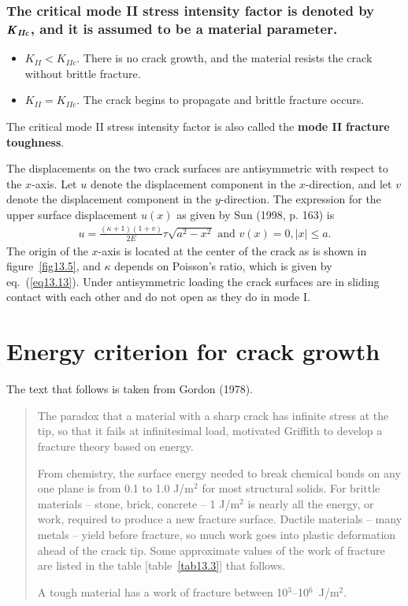 \documentclass{AeroStructure-ERJohnson}
\begin{document}
\subsubsection{The critical mode II stress intensity factor is denoted by $\textbf{\textit{K}}_{\textbf{\textit{IIc}}}$, and it is assumed to be a material parameter.}
\begin{itemize}
\item $K_{I I}<K_{I I c}$. There is no crack growth, and the material resists the crack without brittle fracture.
\item $K_{I I}=K_{I I c}$. The crack begins to propagate and brittle fracture occurs.
\end{itemize}
The critical mode II stress intensity factor is also called the \textbf{mode II} \textbf{fracture toughness}.

The displacements on the two crack surfaces are antisymmetric with respect to the $x$-axis. Let $u$ denote the displacement component in the $x$-direction, and let $v$ denote the displacement component in the $y$-direction. The expression for the upper surface displacement $u(x)$ as given by Sun (1998, p. 163) is
\begin{align}\label{eq13.21}
u=\frac{(\kappa+1)(1+v)}{2 E} \tau \sqrt{a^{2}-x^{2}} \textrm{ and } v(x)=0, |x| \leq a.
\end{align}
The origin of the $x$-axis is located at the center of the crack as is shown in figure~\ref{fig13.5}, and $\kappa$ depends on Poisson's ratio, which is given by eq.~(\ref{eq13.13}). Under antisymmetric loading the crack surfaces are in sliding contact with each other and do not open as they do in mode I.

\section{Energy criterion for crack growth}\label{sec13.5}

The text that follows is taken from Gordon (1978).

\begin{quote}
The paradox that a material with a sharp crack has infinite stress at the tip, so that it fails at infinitesimal load, motivated Griffith to develop a fracture theory based on energy.

From chemistry, the surface energy needed to break chemical bonds on any one plane is from 0.1 to 1.0 J/m$^{2}$ for most structural solids. For brittle materials – stone, brick, concrete – 1 J/m$^{2}$ is nearly all the energy,\vadjust{\vspace*{6pt}\pagebreak} or work, required to produce a new fracture surface. Ductile materials – many metals – yield before fracture, so much work goes into plastic deformation ahead of the crack tip. Some approximate values of the work of fracture are listed in the table [table~\ref{tab13.3}] that follows.

A tough material has a work of fracture between 10$^{3}$--10$^{6}$~J/m$^{2}$.
\end{quote}
\end{document}

